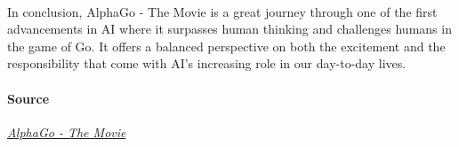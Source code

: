 \documentclass[44pt]{article}
\begin{document}
\paragraph{}
  In conclusion, AlphaGo - The Movie is a great journey through one of the first advancements in AI where it surpasses human thinking and challenges humans in the game of Go.
  It offers a balanced perspective on both the excitement and the responsibility that come with AI’s increasing role in our day-to-day lives.

\paragraph{Source}
	\href{https://www.youtube.com/watch?v=WXuK6gekU1Y}{\em{AlphaGo - The Movie}}




  
\end{document}

